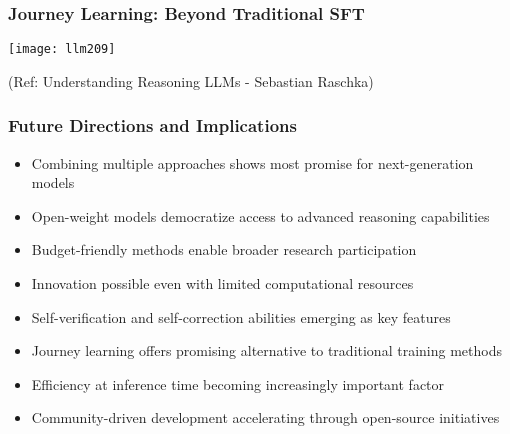 \begin{frame}[fragile]\frametitle{Journey Learning: Beyond Traditional SFT}
	  
  		\begin{center}
		\texttt{[image: llm209]}
		
		{\tiny (Ref: Understanding Reasoning LLMs - Sebastian Raschka)}

		\end{center}		  
\end{frame}

\begin{frame}[fragile]\frametitle{Future Directions and Implications}
      \begin{itemize}
	\item Combining multiple approaches shows most promise for next-generation models
	\item Open-weight models democratize access to advanced reasoning capabilities
	\item Budget-friendly methods enable broader research participation
	\item Innovation possible even with limited computational resources
	\item Self-verification and self-correction abilities emerging as key features
	\item Journey learning offers promising alternative to traditional training methods
	\item Efficiency at inference time becoming increasingly important factor
	\item Community-driven development accelerating through open-source initiatives
	  \end{itemize}
\end{frame}




